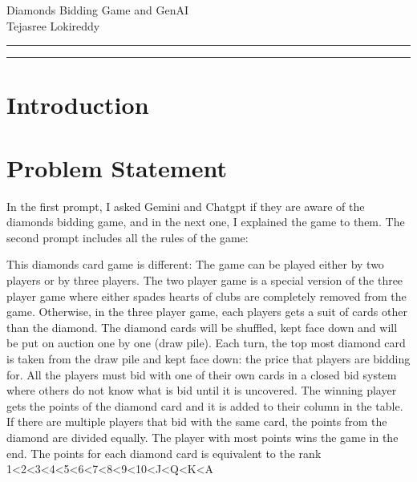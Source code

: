 \documentclass[11pt]{article}
\newcommand{\soptitle}{Diamonds Bidding Game and GenAI}
\begin{document}
\begin{center}\LARGE\soptitle\\
Tejasree Lokireddy
\end{center}

\hrule
\vspace{1pt}
\hrule height 1pt

\bigskip

\section{Introduction}

\section{Problem Statement}
In the first prompt, I asked Gemini and Chatgpt if they are aware of the diamonds bidding game, and in the next one, I explained the game to them. The second prompt includes all the rules of the game:
\vspace{10pt}

This diamonds card game is different: The game can be played either by two players or by three players. The two player game is a special version of the three player game where either spades hearts of clubs are completely removed from the game. Otherwise, in the three player game, each players gets a suit of cards other than the diamond. The diamond cards will be shuffled, kept face down and will be put on auction one by one (draw pile). Each turn, the top most diamond card is taken from the draw pile and kept face down: the price that players are bidding for. All the players must bid with one of their own cards in a closed bid system where others do not know what is bid until it is uncovered. The winning player gets the points of the diamond card and it is added to their column in the table. If there are multiple players that bid with the same card, the points from the diamond are divided equally. The player with most points wins the game in the end. The points for each diamond card is equivalent to the rank 1\textless2\textless3\textless4\textless5\textless6\textless7\textless8\textless9\textless10\textless J\textless Q\textless K\textless A
\end{document}
